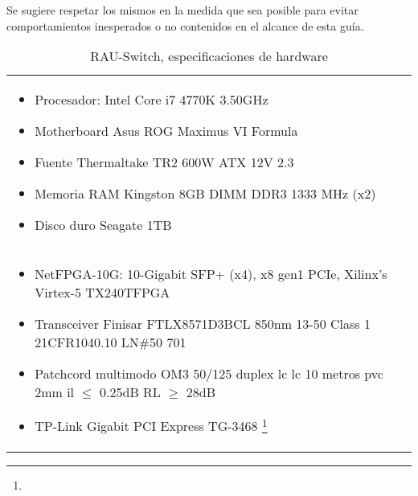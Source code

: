 Se sugiere respetar los mismos en la medida que sea posible para evitar comportamientos inesperados o no contenidos en el alcance de esta guía.\\

\begin{table}[h]\centering
\begin{tabularx}{\textwidth}{|>{\setlength\hsize{1.0\hsize}\setlength\linewidth{\hsize}}X|}
\hline
\multicolumn{1}{|c|}{Hardware}\\
\hline
\begin{itemize}
\item Procesador: Intel Core i7 4770K 3.50GHz
\item Motherboard Asus ROG Maximus VI Formula
\item Fuente Thermaltake TR2 600W ATX 12V 2.3
\item Memoria RAM Kingston 8GB DIMM DDR3 1333 MHz (x2)
\item Disco duro Seagate 1TB
\end{itemize}\\

\begin{itemize}
\item NetFPGA-10G: 10-Gigabit SFP+ (x4), x8 gen1 PCIe, Xilinx’s Virtex-5 TX240TFPGA
\item Transceiver Finisar FTLX8571D3BCL 850nm 13-50
	  Class 1 21CFR1040.10 LN\#50 7\/01
\item Patchcord multimodo OM3 50/125 duplex lc lc 10 metros pvc 2mm
	  il $\leq$ 0.25dB RL $\geq$ 28dB
\item TP-Link Gigabit PCI Express TG-3468 \footnote{}

\end{itemize}\\
\hline
\end{tabularx}
\caption{RAU-Switch, especificaciones de hardware}
\label{table:RAUHSpecs}
\end{table}



